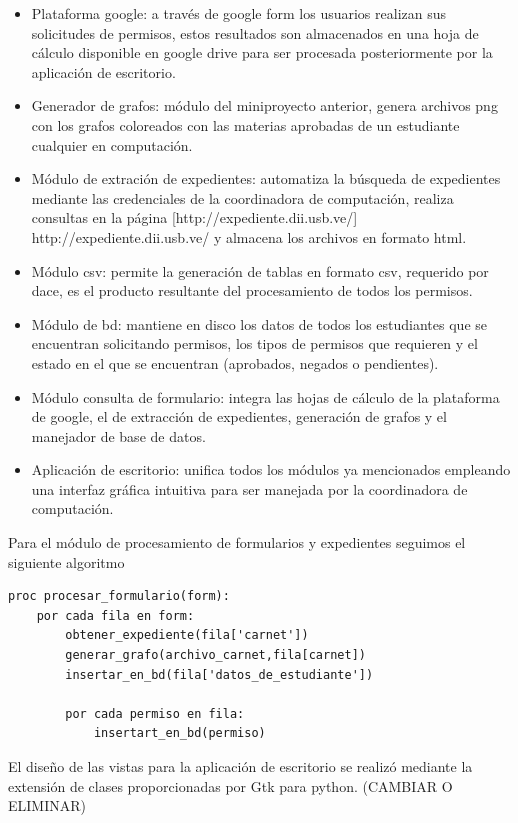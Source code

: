 \documentclass[]{article}
\begin{document}
\begin{itemize}
\itemsep1pt\parskip0pt
\item
  Plataforma google: a través de google form los usuarios realizan sus
  solicitudes de permisos, estos resultados son almacenados en una hoja
  de cálculo disponible en google drive para ser procesada
  posteriormente por la aplicación de escritorio.
\item
  Generador de grafos: módulo del miniproyecto anterior, genera archivos
  png con los grafos coloreados con las materias aprobadas de un
  estudiante cualquier en computación.
\item
  Módulo de extración de expedientes: automatiza la búsqueda de
  expedientes mediante las credenciales de la coordinadora de
  computación, realiza consultas en la página
  {[}http://expediente.dii.usb.ve/{]} http://expediente.dii.usb.ve/ y
  almacena los archivos en formato html.
\item
  Módulo csv: permite la generación de tablas en formato csv, requerido
  por dace, es el producto resultante del procesamiento de todos los
  permisos.
\item
  Módulo de bd: mantiene en disco los datos de todos los estudiantes que
  se encuentran solicitando permisos, los tipos de permisos que
  requieren y el estado en el que se encuentran (aprobados, negados o
  pendientes).
\item
  Módulo consulta de formulario: integra las hojas de cálculo de la
  plataforma de google, el de extracción de expedientes, generación de
  grafos y el manejador de base de datos.
\item
  Aplicación de escritorio: unifica todos los módulos ya mencionados
  empleando una interfaz gráfica intuitiva para ser manejada por la
  coordinadora de computación.
\end{itemize}

Para el módulo de procesamiento de formularios y expedientes seguimos el
siguiente algoritmo

\begin{verbatim}
proc procesar_formulario(form):
    por cada fila en form:
        obtener_expediente(fila['carnet'])
        generar_grafo(archivo_carnet,fila[carnet])
        insertar_en_bd(fila['datos_de_estudiante'])

        por cada permiso en fila:
            insertart_en_bd(permiso)
\end{verbatim}

El diseño de las vistas para la aplicación de escritorio se realizó
mediante la extensión de clases proporcionadas por Gtk para python.
(CAMBIAR O ELIMINAR)
\end{document}
